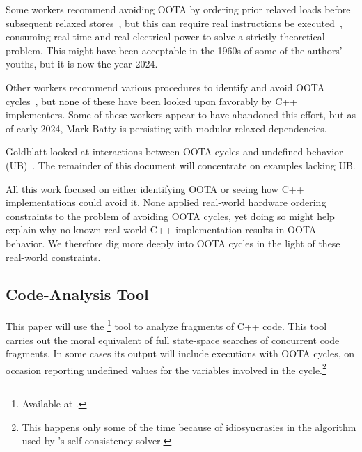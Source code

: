 \documentclass[10]{article}
\begin{document}
Some workers recommend avoiding OOTA by ordering prior relaxed
loads before subsequent relaxed
stores~\cite{Boehm:2014:OGA:2618128.2618134,HansBoehm2019OOTArevisitedAgain,Lahav:2017:RSC:3062341.3062352},
but this can require real instructions be
executed~\cite[Section 7.1]{Maranget2012TutorialARMPower},
consuming real time and real electrical power to solve a strictly
theoretical problem.
This might have been acceptable in the 1960s of some of the authors'
youths, but it is now the year 2024.

Other workers recommend various procedures to identify and avoid OOTA
cycles~\cite{Lahav:2017:RSC:3062341.3062352,Sinclair:2017:CAR:3079856.3080206,Lee:10.1145/3385412.3386010,MarkBatty2019ModularRelaxedDependenciesOOTA},
but none of these have been looked upon favorably by C++ implementers.
Some of these workers appear to have abandoned this effort, but as of
early 2024, Mark Batty is persisting with modular relaxed dependencies.

Goldblatt looked at interactions between OOTA cycles and
undefined behavior (UB)~\cite{DavidGoldblatt2019NoElegantOOTAfix}.
The remainder of this document will concentrate on examples lacking UB.

All this work focused on either identifying OOTA or seeing how C++
implementations could avoid it.
None applied real-world hardware ordering constraints to the problem
of avoiding OOTA cycles,
yet doing so might help explain why no known real-world C++ implementation
results in OOTA behavior.
We therefore dig more deeply into OOTA cycles in the light
of these real-world constraints.

\subsection{Code-Analysis Tool}
\label{sec:Code-Analysis Tool}

This paper will use the \footnote{
	Available at .}
tool to analyze fragments of C++ code.
This tool carries out the moral equivalent of full state-space searches
of concurrent code fragments.
In some cases its output will include executions with OOTA cycles,
on occasion reporting undefined values for the variables involved in
the cycle.\footnote{
	This happens only some of the time because of idiosyncrasies
	in the algorithm used by 's self-consistency solver.}
\end{document}
